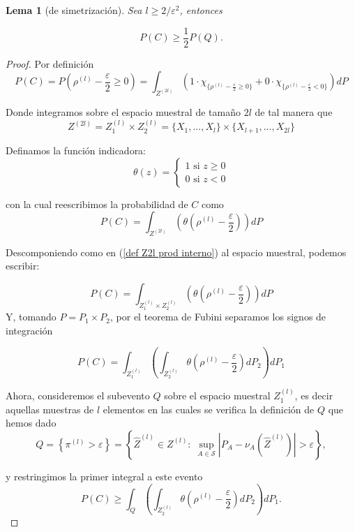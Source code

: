 \documentclass{report}
\newtheorem{lem}{Lema}[section]
\begin{document}
\begin{lem} [de simetrización]
    Sea \( l \geq 2 / \varepsilon^2 \), entonces

    \[
    P(C) \geq \frac{1}{2} P(Q).
    \]
\end{lem}
\begin{proof}
Por definición
\begin{equation*}
P(C) = P\left(\rho^{(l)}-\frac{\varepsilon}{2}\geq 0\right) = \int_{Z^{(2l)}} \left( 1 \cdot \chi_{\{\rho^{(l)}-\frac{\varepsilon}{2}\geq 0\}} + 
0 \cdot \chi_{\{\rho^{(l)}-\frac{\varepsilon}{2}< 0\}} \right) dP
\end{equation*}

Donde integramos sobre el espacio muestral de tamaño $2l$ de tal manera que
\begin{equation}
    Z^{(2l)} = Z_1^{(l)}\times Z_2^{(l)} = \{X_1,\dots,X_l\} \times \{X_{l+1},\dots,X_{2l}\} \label{def Z2l prod interno}
\end{equation}


Definamos la función indicadora: 
\[
\theta(z)=\begin{cases}
    1 \text{ si } z\geq 0 \\
    0 \text{ si } z< 0
\end{cases}  
\]

con la cual reescribimos la probabilidad de $C$ como
\begin{equation}
P(C) = \int_{Z^{(2l)}} \left( \theta\left(\rho^{(l)}-\frac{\varepsilon}{2}\right)\right) dP
\end{equation}

Descomponiendo como en (\ref{def Z2l prod interno}) al espacio muestral, podemos escribir:

\[
P(C) = \int_{Z_1^{(l)}\times Z_2^{(l)}} \left( \theta\left(\rho^{(l)}-\frac{\varepsilon}{2}\right)\right) dP
\]
Y, tomando $P=P_1\times P_2$, por el teorema de Fubini separamos los signos de integración

\[
P(C) = \int_{Z_1^{(l)}} \left( \int_{ Z_2^{(l)}}  \theta\left(\rho^{(l)}-\frac{\varepsilon}{2}\right) dP_2\right) dP_1
\]

Ahora, consideremos el subevento $Q$ sobre el espacio muestral $Z_1^{(l)}$, es decir aquellas muestras de $l$
elementos en las cuales se verifica la definición de $Q$ que hemos dado
\[
Q = \left\{ \pi^{(l)} > \varepsilon \right\} = \left\{\hat{Z}^{(l)}\in Z^{(l)}:\; 
\sup_{A\in\mathcal{S}}\left|P_A - \nu_A\left(\hat{Z}^{(l)}\right)\right| > \varepsilon \right\},
\]

y restringimos la primer integral a este evento
\begin{equation}
P(C) \geq \int_{Q} \left( \int_{ Z_2^{(l)}}  \theta\left(\rho^{(l)}-\frac{\varepsilon}{2}\right) dP_2\right) dP_1. \label{desigualdad P(C)}
\end{equation}


\end{proof}
\end{document}
